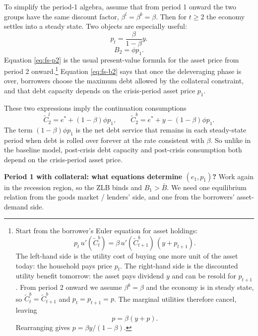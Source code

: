 \documentclass[11pt,a4paper]{article}
\begin{document}
To simplify the period-1 algebra, assume that from period 1 onward the two groups have the same discount factor, $\beta^l=\beta^b=\beta$. Then for $t\geq2$ the economy settles into a steady state. Two objects are especially useful:
\begin{equation}\label{eq:fs-p2}
p_t = \frac{\beta}{1-\beta}y.
\end{equation}
\begin{equation}\label{eq:fs-b2}
B_2 = \phi p_1.
\end{equation}
Equation \eqref{eq:fs-p2} is the usual present-value formula for the asset price from period 2 onward.\footnote{Start from the borrower's Euler equation for asset holdings:
\[
p_t\,u'(\tilde C_t^b)=\beta\,u'(\tilde C_{t+1}^b)\,(y+p_{t+1}).
\]
The left-hand side is the utility cost of buying one more unit of the asset today: the household pays price $p_t$. The right-hand side is the discounted utility benefit tomorrow: the asset pays dividend $y$ and can be resold for $p_{t+1}$. From period 2 onward we assume $\beta^b=\beta$ and the economy is in steady state, so $\tilde C_t^b=\tilde C_{t+1}^b$ and $p_t=p_{t+1}=p$. The marginal utilities therefore cancel, leaving
\[
p=\beta(y+p).
\]
Rearranging gives $p=\beta y/(1-\beta)$.} Equation \eqref{eq:fs-b2} says that once the deleveraging phase is over, borrowers choose the maximum debt allowed by the collateral constraint, and that debt capacity depends on the crisis-period asset price $p_1$.

These two expressions imply the continuation consumptions
\begin{equation}\label{eq:fs-c2}
\tilde{C}_2^l=e^*+(1-\beta)\phi p_1,
\qquad
\tilde{C}_2^b=e^*+y-(1-\beta)\phi p_1.
\end{equation}
The term $(1-\beta)\phi p_1$ is the net debt service that remains in each steady-state period when debt is rolled over forever at the rate consistent with $\beta$. So unlike in the baseline model, post-crisis debt capacity and post-crisis consumption both depend on the crisis-period asset price.

\textbf{Period 1 with collateral: what equations determine $(e_1,p_1)$?} Work again in the recession region, so the ZLB binds and $B_1>\bar{B}$. We need one equilibrium relation from the goods market / lenders' side, and one from the borrowers' asset-demand side.
\end{document}
